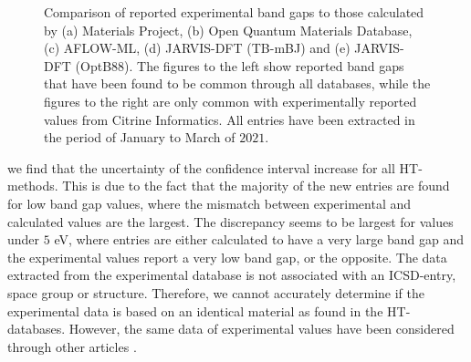 \clearpage
\begin{figure}[ht!]
    \centering
    \begin{subfigure}[t]{1\textwidth}
        \centering
        
        \caption{}
    \end{subfigure}%

    \begin{subfigure}[t]{1\textwidth}
        \centering
        
        \caption{}
    \end{subfigure}

    \begin{subfigure}[t]{1\textwidth}
        \centering
        
        \caption{}
    \end{subfigure}
\end{figure}

\begin{figure}[t!]\ContinuedFloat
    \centering
    \begin{subfigure}[t]{1\textwidth}
        \centering
        
        \caption{}
    \end{subfigure}%

    \begin{subfigure}[t]{1\textwidth}
        \centering
        
        \caption{}
    \end{subfigure}
    \vspace*{-130mm}
    \caption{Comparison of reported experimental band gaps to those calculated by (a) Materials Project, (b) Open Quantum Materials Database, (c) AFLOW-ML, (d) JARVIS-DFT (TB-mBJ) and (e) JARVIS-DFT (OptB88). The figures to the left show reported band gaps that have been found to be common through all databases, while the figures to the right are only common with experimentally reported values from Citrine Informatics. All entries have been extracted in the period of January to March of $2021$. }
    \label{fig:band gaps}
\end{figure}

\clearpage

\noindent we find that the uncertainty of the confidence interval increase for all HT- methods.
This is due to the fact that the majority of the new entries are found for low band gap values, where the mismatch between experimental and calculated values are the largest.
The discrepancy seems to be largest for values under $5$ eV, where entries are either calculated to have a very large band gap and the experimental values report a very low band gap, or the opposite.
The data extracted from the experimental database is not associated with an ICSD-entry, space group or structure. Therefore, we cannot accurately determine if the experimental data is based on an identical material as found in the HT-databases. However, the same data of experimental values have been considered through other articles \cite{Ward2018, Ferrenti2020}.

